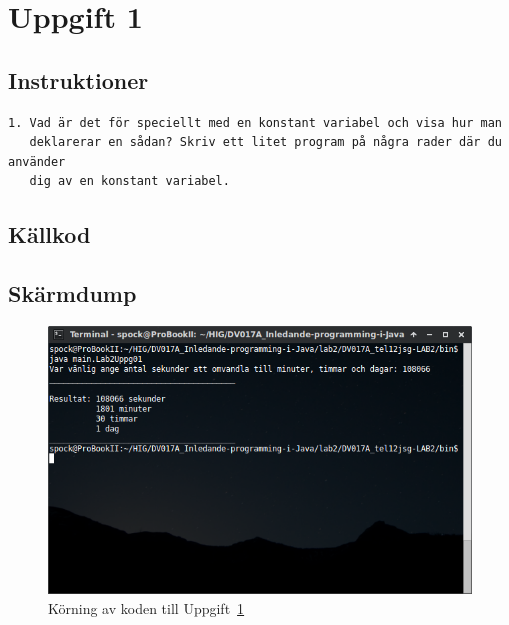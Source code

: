 \section{Uppgift 1}\label{sec:uppg01}

\subsection{Instruktioner}
\begin{verbatim}
1. Vad är det för speciellt med en konstant variabel och visa hur man
   deklarerar en sådan? Skriv ett litet program på några rader där du använder
   dig av en konstant variabel.
\end{verbatim}


\subsection{Källkod}
\label{src:uppg01}


\subsection{Skärmdump}
\begin{figure}[htbp]
    \centering
        \includegraphics[width=\linewidth]{img/01.png}
    \caption{Körning av koden till Uppgift~\ref{sec:uppg01}}
\label{fig:uppg01-screenshot}
\end{figure}

